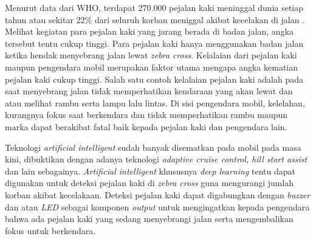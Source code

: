 \documentclass[conference]{IEEEtran}
\begin{document}
	
	\vspace{1ex}
	
	Menurut data dari WHO, terdapat 270.000 pejalan kaki meninggal dunia setiap tahun atau sekitar 22\% dari seluruh korban meniggal akibat kecelakan di jalan \cite{cit:14}. Melihat kegiatan para pejalan kaki yang jarang berada di badan jalan, angka tersebut tentu cukup tinggi. Para pejalan kaki hanya menggunakan badan jalan ketika hendak menyebrang jalan lewat \textit{zebra cross}. Kelalaian dari pejalan kaki maupun pengendara mobil merupakan faktor utama mengapa angka kematian pejalan kaki cukup tinggi. Salah satu contoh kelalaian pejalan kaki adalah pada saat menyebrang jalan tidak memperhatikan kendaraan yang akan lewat dan atau melihat rambu serta lampu lalu lintas. Di sisi pengendara mobil, kelelahan, kurangnya fokus saat berkendara dan tidak memperhatikan rambu maupun marka dapat berakibat fatal baik kepada pejalan kaki dan pengendara lain.
	
	\vspace{1ex}
	
	Teknologi \textit{artificial intelligent} sudah banyak disematkan pada mobil pada masa kini, dibuktikan dengan adanya teknologi \textit{adaptive cruise control, hill start assist} dan lain sebagainya. \textit{Artificial intelligent} khususnya \textit{deep learning} tentu dapat digunakan untuk deteksi pejalan kaki di \textit{zebra cross} guna mengurangi jumlah korban akibat kecelakaan. Deteksi pejalan kaki dapat digabungkan dengan \textit{buzzer} dan atau \textit{LED} sebagai komponen \textit{output} untuk mengingatkan kepada pengendara bahwa ada pejalan kaki yang sedang menyebrangi jalan serta mengembalikan fokus untuk berkendara.
	
	\vspace{1ex} 
	
\end{document}
